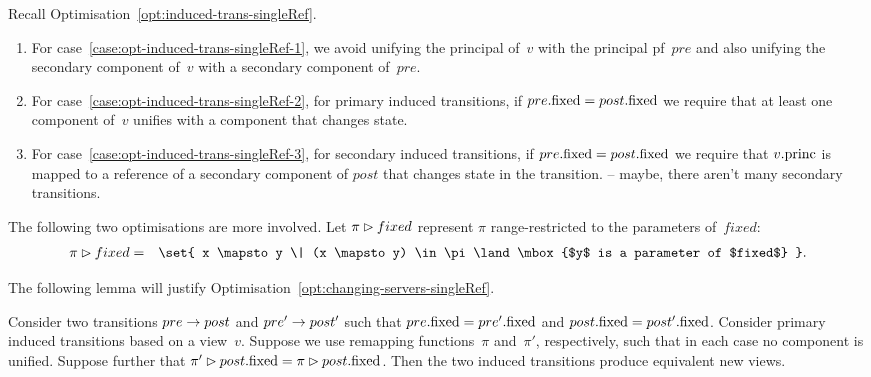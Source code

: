 \begin{opt}
\label{opt:effectOn-singleRef}
Recall Optimisation~\ref{opt:induced-trans-singleRef}.
\begin{enumerate}
\item For case~\ref{case:opt-induced-trans-singleRef-1}, we avoid unifying the
  principal of~$v$ with the principal pf~$pre$ and also unifying the secondary
  component of~$v$ with a secondary component of~$pre$. 

\item For case~\ref{case:opt-induced-trans-singleRef-2}, for primary induced
  transitions, if $pre.\mathrm{fixed} = post.\mathrm{fixed}$ we require that at least one
  component of~$v$ unifies with a component that changes state.

\item For case~\ref{case:opt-induced-trans-singleRef-3}, for secondary induced
  transitions, if $pre.\mathrm{fixed} = post.\mathrm{fixed}$ we require that $v.\mathrm{princ}$ is
  mapped to a reference of a secondary component of $post$ that changes state
  in the transition.   -- maybe, there aren't many secondary
  transitions.
\end{enumerate}
\end{opt}


The following two optimisations are more involved.
%
Let $\pi \rhd fixed$ represent $\pi$ range-restricted to the parameters
of~$fixed$: 
%
\begin{eqnarray*}
\pi \rangeRes fixed & = & \set{ x \mapsto y \| (x \mapsto y) \in \pi 
  \land \mbox{$y$ is a parameter of $fixed$} }. 
\end{eqnarray*}
%
%

The following lemma will justify
Optimisation~\ref{opt:changing-servers-singleRef}. 
%
\begin{lemma}
\label{lem:changing-servers-singleRef}
Consider two transitions $pre \stackrel{}\rightarrow post$ and $pre' \stackrel{}\rightarrow post'$ such
that $pre.\mathrm{fixed} = pre'.\mathrm{fixed}$ and $post.\mathrm{fixed} = post'.\mathrm{fixed}$.  Consider
primary induced transitions based on a view~$v$.  Suppose we use remapping
functions~$\pi$ and~$\pi'$, respectively, such that in each case no component
is unified.  Suppose further that $\pi' \rhd post.\mathrm{fixed} = \pi \rhd
post.\mathrm{fixed}$.  Then the two induced transitions produce equivalent new views.
\end{lemma}

